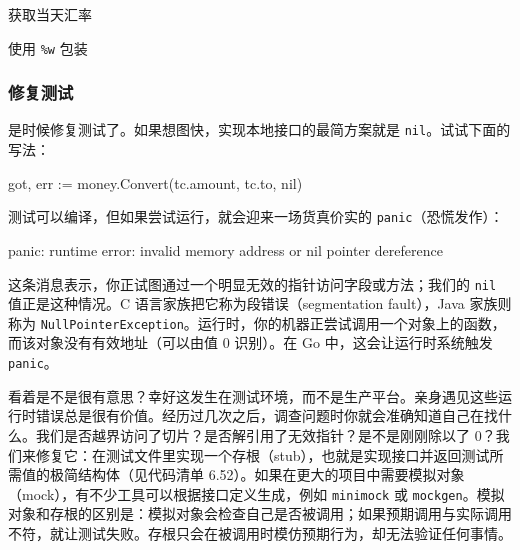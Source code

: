
\begin{codeannotations}
\item 获取当天汇率
\item 使用 \texttt{\%w} 包装
\end{codeannotations}

\subsubsection*{修复测试}

是时候修复测试了。如果想图快，实现本地接口的最简方案就是 \texttt{nil}。试试下面的写法：

\begin{gocode}[]
got, err := money.Convert(tc.amount, tc.to, nil)
\end{gocode}

测试可以编译，但如果尝试运行，就会迎来一场货真价实的 \texttt{panic}（恐慌发作）：

\begin{shellcode}[]
panic: runtime error: invalid memory address or nil pointer dereference
\end{shellcode}

这条消息表示，你正试图通过一个明显无效的指针访问字段或方法；我们的 \texttt{nil} 值正是这种情况。C 语言家族把它称为段错误（segmentation fault），Java 家族则称为 \texttt{NullPointerException}。运行时，你的机器正尝试调用一个对象上的函数，而该对象没有有效地址（可以由值 0 识别）。在 Go 中，这会让运行时系统触发 \texttt{panic}。

看着是不是很有意思？幸好这发生在测试环境，而不是生产平台。亲身遇见这些运行时错误总是很有价值。经历过几次之后，调查问题时你就会准确知道自己在找什么。我们是否越界访问了切片？是否解引用了无效指针？是不是刚刚除以了 0？我们来修复它：在测试文件里实现一个存根（stub），也就是实现接口并返回测试所需值的极简结构体（见代码清单 6.52）。如果在更大的项目中需要模拟对象（mock），有不少工具可以根据接口定义生成，例如 \texttt{minimock} 或 \texttt{mockgen}。模拟对象和存根的区别是：模拟对象会检查自己是否被调用；如果预期调用与实际调用不符，就让测试失败。存根只会在被调用时模仿预期行为，却无法验证任何事情。

